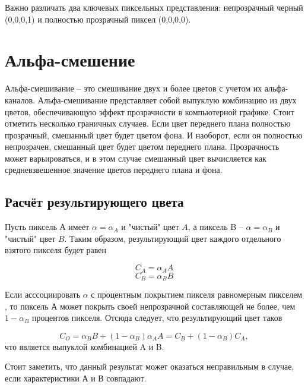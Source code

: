Важно различать два ключевых пиксельных представления:
непрозрачный черный  (0,0,0,1) и полностью прозрачный пиксел  (0,0,0,0).


\section{Альфа-смешение}
Альфа-смешивание -- это смешивание двух и более цветов с учетом их альфа-каналов. Альфа-смешивание представляет собой выпуклую комбинацию из двух цветов, обеспечивающую эффект прозрачности в компьютерной графике. Стоит отметить несколько граничных случаев. Если цвет переднего плана полностью прозрачный, смешанный цвет будет цветом фона. И наоборот, если он полностью непрозрачен, смешанный цвет будет цветом переднего плана.
Прозрачность может варьироваться, и в этом случае смешанный цвет вычисляется как средневзвешенное значение цветов переднего плана и фона.

\subsection{Расчёт результирующего цвета}
Пусть пиксель А имеет $\alpha = \alpha_{A}$ и "чистый" цвет $A$, а пиксель B  -- $\alpha = \alpha_{B}$ и "чистый" цвет $B$. Таким образом,  результирующий цвет каждого отдельного взятого пикселя будет равен

\begin{equation}
C_{A} = \alpha_{A}A 
\end{equation}
\begin{equation}
C_{B} = \alpha_{B}B
\end{equation}

Если асссоциировать $\alpha$ с процентным покрытием пикселя равномерным пикселем \cite{bib1}, то пиксель А может покрыть своей непрозрачной составляющей не более, чем $1- \alpha_{B}$ процентов пикселя.  Отсюда следует, что результирующий цвет таков

\begin{equation}
C_{O} = \alpha_{B}B + (1- \alpha_{B})\alpha_{A}A = C_{B} + (1- \alpha_{B})C_{A},
\end{equation}
что является выпуклой комбинацией A и B.


Стоит заметить, что данный результат может оказаться неправильным в случае, если характеристики  А и В совпадают.  


